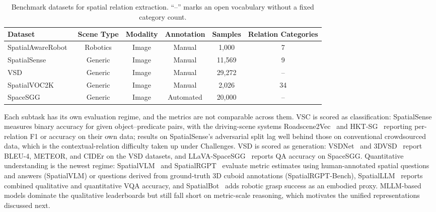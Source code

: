 \begin{table}[!t]
\centering
\caption{Benchmark datasets for spatial relation extraction. ``--'' marks an open vocabulary without a fixed category count.}
\label{tab:sre_dataset}
\fontsize{9}{11}\selectfont
\setlength{\tabcolsep}{3mm}
\begin{tabular}{lccccc}
\toprule
\textbf{Dataset} & \textbf{Scene Type} & \textbf{Modality} & \textbf{Annotation} & \textbf{Samples} & \textbf{Relation Categories} \\
\midrule
SpatialAwareRobot~\cite{wang2025spatial} & Robotics & Image & Manual & 1,000 & 7 \\
SpatialSense~\cite{yang2019spatialsense} & Generic & Image & Manual & 11,569 & 9 \\
VSD~\cite{zhao2022visual} & Generic & Image & Manual & 29,272  & -- \\
SpatialVOC2K~\cite{belz2018spatialvoc2k} & Generic & Image & Manual & 2,026  & 34 \\
SpaceSGG~\cite{xu2025llava} & Generic & Image & Automated & 20,000  & --  \\
\bottomrule
\end{tabular}
\end{table}

Each subtask has its own evaluation regime, and the metrics are not comparable across them.
VSC is scored as classification: SpatialSense~\cite{yang2019spatialsense} measures binary accuracy for given object--predicate pairs, with the driving-scene systems Roadscene2Vec~\cite{malawade2022roadscene2vec} and HKT-SG~\cite{zhou2024hktsg} reporting per-relation F1 or accuracy on their own data; results on SpatialSense's adversarial split lag well behind those on conventional crowdsourced data, which is the contextual-relation difficulty taken up under Challenges.
VSD is scored as generation: VSDNet~\cite{zhao2022visual} and 3DVSD~\cite{zhao2023generating} report BLEU-4, METEOR, and CIDEr on the VSD datasets, and LLaVA-SpaceSGG~\cite{xu2025llava} reports QA accuracy on SpaceSGG.
Quantitative understanding is the newest regime: SpatialVLM~\cite{chen2024spatialvlm} and SpatialRGPT~\cite{cheng2024spatialrgpt} evaluate metric estimates using human-annotated spatial questions and answers (SpatialVLM) or questions derived from ground-truth 3D cuboid annotations (SpatialRGPT-Bench), SpatialLLM~\cite{ma2025spatialllm} reports combined qualitative and quantitative VQA accuracy, and SpatialBot~\cite{cai2024spatialbot} adds robotic grasp success as an embodied proxy.
MLLM-based models dominate the qualitative leaderboards but still fall short on metric-scale reasoning, which motivates the unified representations discussed next.


